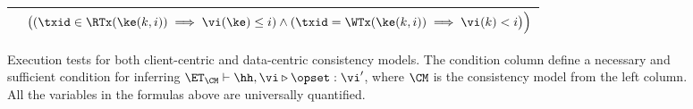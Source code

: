 \begin{figure}
\begin{tabular}{ lr }
& $\big( (\txid \in \RTx(\ke(k, i)) \implies \vi(\ke) \leq i) \wedge (\txid = \WTx(\ke(k,i)) \implies \vi(k) < i \big) \Big)$\\
\hline
\end{tabular}
\caption{Execution tests for both client-centric and data-centric consistency models. 
The condition column define a necessary and sufficient condition for inferring $\ET_{\CM} \vdash \hh, \vi \triangleright \opset : \vi'$,  
where $\CM$ is the consistency model from the left column.
All the variables in the formulas above are universally quantified.}
\label{fig:execution.tests}
\end{figure}

